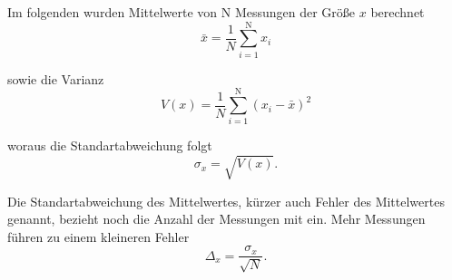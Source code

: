 Im folgenden wurden Mittelwerte von N Messungen der Größe $x$ berechnet
\begin {equation}
\bar{x} =  \frac{1}{N} \sum_{i=1}^\text{N} x_i
\end{equation}

sowie die Varianz
\begin {equation}
V(x) = \frac{1}{N} \sum_{i=1}^\text{N} (x_i - \bar{x})^2
\end{equation}

woraus die Standartabweichung folgt
\begin {equation}
\sigma_x = \sqrt{V(x)}.
\end{equation}

Die Standartabweichung des Mittelwertes, kürzer auch Fehler des Mittelwertes genannt, bezieht noch die Anzahl der Messungen mit ein. Mehr Messungen führen zu einem kleineren Fehler
\begin {equation}
\Delta_{x} = \frac{\sigma_x}{\sqrt{N}}.
\end{equation}